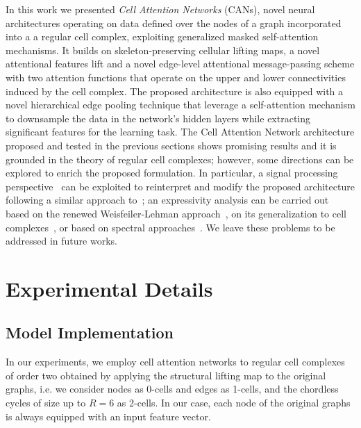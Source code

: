 \documentclass{article}
\begin{document}
In this work we presented \emph{Cell Attention Networks} (CANs),  novel neural architectures operating on data defined over the nodes of a graph incorporated into a
a regular cell complex, exploiting generalized masked self-attention mechanisms. It builds on skeleton-preserving cellular lifting maps, a novel attentional features lift  and a novel edge-level attentional message-passing scheme with two attention functions that operate on the upper and lower connectivities induced by the cell complex.
 The proposed architecture is also equipped with a novel hierarchical edge pooling technique that leverage a self-attention mechanism to downsample the data in the network's hidden layers while extracting significant features for the learning task. The Cell Attention Network architecture proposed and tested in the previous sections shows promising results and it is grounded in the theory of regular cell complexes; however, some directions can be explored to enrich the proposed formulation. In particular, a signal processing perspective~\cite{sardellitti2022cell} can be exploited to reinterpret
 and modify the proposed architecture following a similar approach to~\cite{giusti22}; an expressivity analysis can be carried out based on the renewed Weisfeiler-Lehman approach~\cite{xu2018powerful}, on its generalization to cell complexes~\cite{bodnarcwnet,hajij2022}, or based on spectral approaches~\cite{ribeiro2022aremore}. We leave these problems to be addressed in future works.








\appendix


\section{Experimental Details}\label{sec:additional_exp}


\subsection{Model Implementation}

In our experiments, we employ cell attention networks to regular cell complexes of order two obtained by applying the structural lifting map to the original graphs, i.e. we consider nodes as 0-cells and edges as 1-cells, and the chordless cycles of size up to $R=6$ as 2-cells. In our case, each node of the original graphs is always equipped with an input feature vector.
\end{document}
